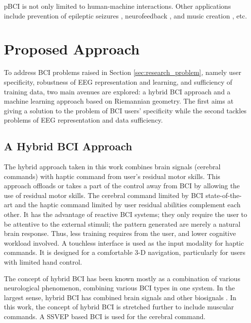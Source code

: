 pBCI is not only limited to human-machine interactions. Other applications include prevention of epileptic seizures \citep{liang_closed-loop_2010}, neurofeedback \citep{huster_braincomputer_2014,hao_visual_2014}, and music creation \citep{yuksel_implicit_2015}, etc.



\section{Proposed Approach}
\label{sec:proposed-approach}

To address BCI problems raised in Section \ref{sec:research_problem}, namely user specificity, robustness of EEG representation and learning, and sufficiency of training data, two main avenues are explored: a hybrid BCI approach and a machine learning approach based on Riemannian geometry.
The first aims at giving a solution to the problem of BCI users' specificity while the second tackles problems of EEG representation and data sufficiency.  

\subsection*{A Hybrid BCI Approach}
The hybrid approach taken in this work combines brain signals (cerebral commands) with haptic command from user's residual motor skills.
This approach offloads or takes a part of the control away from BCI by allowing the use of residual motor skills.
The cerebral command limited by BCI state-of-the-art and the haptic command limited by user residual abilities complement each other.
It has the advantage of reactive BCI systems; they only require the user to be attentive to the external stimuli; the pattern generated are merely a natural brain response. Thus, less training requires from the user, and lower cognitive workload involved.
A touchless interface is used as the input modality for haptic commands. It is designed for a comfortable 3-D navigation, particularly for users with limited hand control. 

The concept of hybrid BCI has been known mostly as a combination of various neurological phenomenon, combining various BCI types in one system. In the largest sense, hybrid BCI has combined brain signals and other biosignals \citep{millan_combining_2010}. 
In this work, the concept of hybrid BCI is stretched further  to include muscular commands. 
A SSVEP based BCI is used for the cerebral command. 

